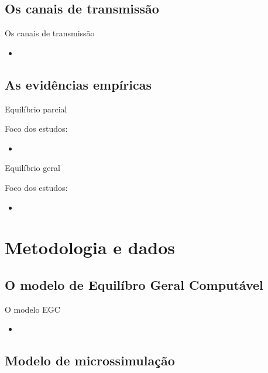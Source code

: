 \documentclass[10pt]{sintefbeamer}
\begin{document}
\subsection{Os canais de transmissão}

\begin{frame}{Os canais de transmissão}
	\begin{itemize}
		\item
	\end{itemize}
\end{frame}


\subsection{As evidências empíricas}

\begin{frame}{Equilíbrio parcial}
	
	Foco dos estudos:
	
	\begin{itemize}
		\item 
	\end{itemize}
\end{frame}

\begin{frame}{Equilíbrio geral}
	
	Foco dos estudos:
	
	\begin{itemize}
		\item 
	\end{itemize}
\end{frame}



\section{Metodologia e dados}

\subsection{O modelo de Equilíbro Geral Computável}

\begin{frame}{O modelo EGC}
	\begin{itemize}[<+->]
		\item 
	\end{itemize}
\end{frame}


\subsection{Modelo de microssimulação}
\end{document}
